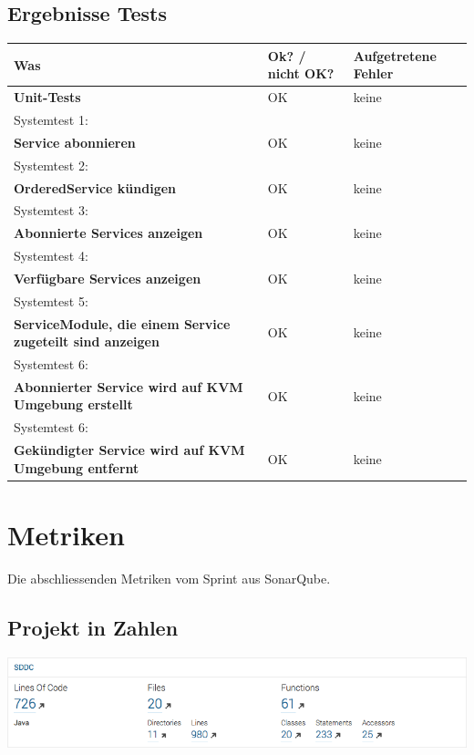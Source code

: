 \subsection{Ergebnisse Tests}
\begin{tabularx}{\linewidth}{X l l}
\textbf{Was} & \textbf{Ok? / nicht OK?} & \textbf{Aufgetretene Fehler}\\
\hline
\textbf{Unit-Tests} & {\color{green} OK}  & keine\\
\hline
Systemtest 1: & & \\
\textbf{Service abonnieren} & {\color{green} OK} & keine\\
\hline
Systemtest 2: & & \\
\textbf{OrderedService kündigen} & {\color{green} OK}  & keine\\
\hline
Systemtest 3: & & \\
\textbf{Abonnierte Services anzeigen} & {\color{green} OK}  & keine\\
\hline
Systemtest 4: & & \\
\textbf{Verfügbare Services anzeigen} & {\color{green} OK}  & keine\\
\hline
Systemtest 5: & & \\
\textbf{ServiceModule, die einem Service zugeteilt sind anzeigen} & {\color{green} OK}  & keine\\
\hline
Systemtest 6: & & \\
\textbf{Abonnierter Service wird auf KVM Umgebung erstellt} & {\color{green} OK}  & keine\\
\hline
Systemtest 6: & & \\
\textbf{Gekündigter Service wird auf KVM Umgebung entfernt} & {\color{green} OK}  & keine\\
\hline



\end{tabularx}

\newpage

\section{Metriken}
Die abschliessenden Metriken vom Sprint aus SonarQube.
\subsection{Projekt in Zahlen}
\includegraphics[width=\textwidth]{./10_Protokolle/04_Testprotokoll/images/Sprint2/loc}

